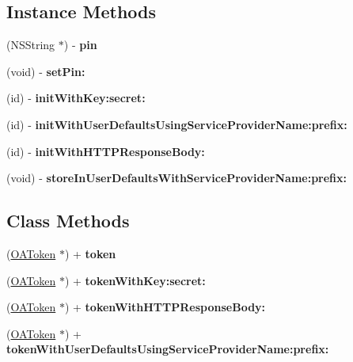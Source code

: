 \subsection*{Instance Methods}
\begin{DoxyCompactItemize}
\item 
\mbox{\label{interfaceOAToken_af019fe62c87818a82ee66062f41f7846}} 
(N\+S\+String $\ast$) -\/ {\bfseries pin}
\item 
\mbox{\label{interfaceOAToken_a9011b2566b4a7059c1d01a0b61fa526f}} 
(void) -\/ {\bfseries set\+Pin\+:}
\item 
\mbox{\label{interfaceOAToken_a0125f69310b16ba329169f7e618ee289}} 
(id) -\/ {\bfseries init\+With\+Key\+:secret\+:}
\item 
\mbox{\label{interfaceOAToken_acbb46b6892004568b1ddfea904c22b96}} 
(id) -\/ {\bfseries init\+With\+User\+Defaults\+Using\+Service\+Provider\+Name\+:prefix\+:}
\item 
\mbox{\label{interfaceOAToken_a39bac69d4a054501c43bcbd0001706aa}} 
(id) -\/ {\bfseries init\+With\+H\+T\+T\+P\+Response\+Body\+:}
\item 
\mbox{\label{interfaceOAToken_a5425d8be96ebbca37210a30ccaddd939}} 
(void) -\/ {\bfseries store\+In\+User\+Defaults\+With\+Service\+Provider\+Name\+:prefix\+:}
\end{DoxyCompactItemize}
\subsection*{Class Methods}
\begin{DoxyCompactItemize}
\item 
\mbox{\label{interfaceOAToken_ab2eda2b06e2213772bb054013888ae49}} 
(\hyperlink{interfaceOAToken}{O\+A\+Token} $\ast$) + {\bfseries token}
\item 
\mbox{\label{interfaceOAToken_af3d9e94e11d3c17c372dbbb448636673}} 
(\hyperlink{interfaceOAToken}{O\+A\+Token} $\ast$) + {\bfseries token\+With\+Key\+:secret\+:}
\item 
\mbox{\label{interfaceOAToken_aee4ee00a673150c1cdc0e6e8a8ff5e1f}} 
(\hyperlink{interfaceOAToken}{O\+A\+Token} $\ast$) + {\bfseries token\+With\+H\+T\+T\+P\+Response\+Body\+:}
\item 
\mbox{\label{interfaceOAToken_a97343a60c55c6e646703d05b97fdc3bd}} 
(\hyperlink{interfaceOAToken}{O\+A\+Token} $\ast$) + {\bfseries token\+With\+User\+Defaults\+Using\+Service\+Provider\+Name\+:prefix\+:}
\end{DoxyCompactItemize}

